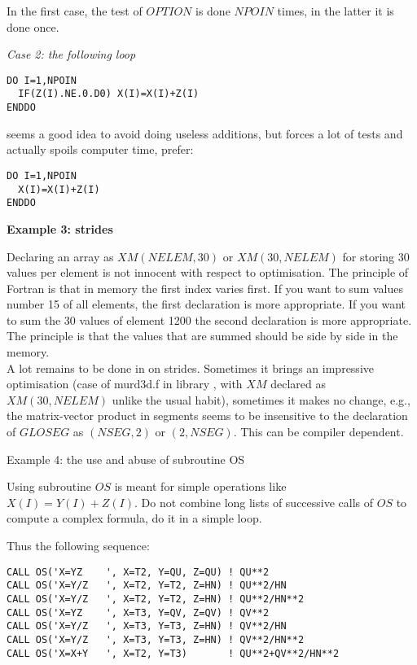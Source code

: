 In the first case, the test of $OPTION$ is done $NPOIN$ times, in the latter it
is done once.

\textit{Case 2: the following loop}
\begin{lstlisting}
DO I=1,NPOIN
  IF(Z(I).NE.0.D0) X(I)=X(I)+Z(I)
ENDDO
\end{lstlisting}

seems a good idea to avoid doing useless additions, but forces a lot of tests
and actually spoils computer time, prefer:

\begin{lstlisting}
DO I=1,NPOIN
  X(I)=X(I)+Z(I)
ENDDO
\end{lstlisting}

\textbf{Example 3: strides}

Declaring an array as $XM(NELEM,30)$ or $XM(30,NELEM)$ for storing 30 values
per element is not innocent with respect to optimisation. The principle of
Fortran is that in memory the first index varies first. If you want to sum
values number 15 of all elements, the first declaration is more appropriate. If
you want to sum the 30 values of element 1200 the second declaration is more
appropriate. The principle is that the values that are summed should be side by
side in the memory.\\

A lot remains to be done in \telemacsystem on strides. Sometimes it brings an
impressive optimisation (case of murd3d.f in library , with $XM$
declared as $XM(30,NELEM)$ unlike the usual habit), sometimes it makes no
change, e.g., the matrix-vector product in segments seems to be insensitive to
the declaration of $GLOSEG$ as $(NSEG,2)$ or $(2,NSEG)$. This can be compiler
dependent.

Example 4: the use and abuse of subroutine OS

Using subroutine $OS$ is meant for simple operations like $X(I)=Y(I)+Z(I)$. Do
not combine long lists of successive calls of $OS$ to compute a complex formula,
do it in a simple loop.

Thus the following sequence:
\begin{lstlisting}
CALL OS('X=YZ    ', X=T2, Y=QU, Z=QU) ! QU**2
CALL OS('X=Y/Z   ', X=T2, Y=T2, Z=HN) ! QU**2/HN
CALL OS('X=Y/Z   ', X=T2, Y=T2, Z=HN) ! QU**2/HN**2
CALL OS('X=YZ    ', X=T3, Y=QV, Z=QV) ! QV**2
CALL OS('X=Y/Z   ', X=T3, Y=T3, Z=HN) ! QV**2/HN
CALL OS('X=Y/Z   ', X=T3, Y=T3, Z=HN) ! QV**2/HN**2
CALL OS('X=X+Y   ', X=T2, Y=T3)       ! QU**2+QV**2/HN**2
\end{lstlisting}

